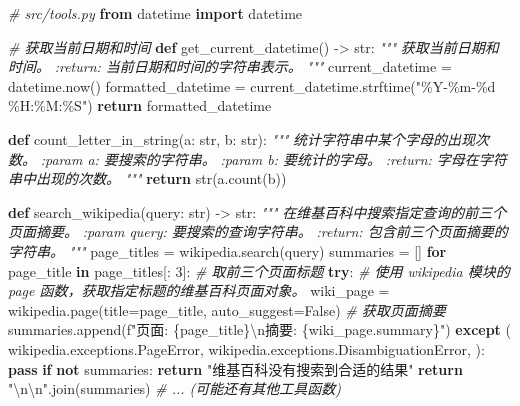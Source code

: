 \documentclass[
]{article}
\newenvironment{Shaded}{}{}
\newcommand{\BuiltInTok}[1]{\textcolor[rgb]{0.00,0.50,0.00}{#1}}
\newcommand{\CharTok}[1]{\textcolor[rgb]{0.25,0.44,0.63}{#1}}
\newcommand{\CommentTok}[1]{\textcolor[rgb]{0.38,0.63,0.69}{\textit{#1}}}
\newcommand{\ControlFlowTok}[1]{\textcolor[rgb]{0.00,0.44,0.13}{\textbf{#1}}}
\newcommand{\DecValTok}[1]{\textcolor[rgb]{0.25,0.63,0.44}{#1}}
\newcommand{\ImportTok}[1]{\textcolor[rgb]{0.00,0.50,0.00}{\textbf{#1}}}
\newcommand{\KeywordTok}[1]{\textcolor[rgb]{0.00,0.44,0.13}{\textbf{#1}}}
\newcommand{\NormalTok}[1]{#1}
\newcommand{\OperatorTok}[1]{\textcolor[rgb]{0.40,0.40,0.40}{#1}}
\newcommand{\SpecialCharTok}[1]{\textcolor[rgb]{0.25,0.44,0.63}{#1}}
\newcommand{\SpecialStringTok}[1]{\textcolor[rgb]{0.73,0.40,0.53}{#1}}
\newcommand{\StringTok}[1]{\textcolor[rgb]{0.25,0.44,0.63}{#1}}
\newcommand{\VariableTok}[1]{\textcolor[rgb]{0.10,0.09,0.49}{#1}}
\begin{document}
\begin{Shaded}
\begin{Highlighting}[]
\CommentTok{\# src/tools.py}
\ImportTok{from}\NormalTok{ datetime }\ImportTok{import}\NormalTok{ datetime}

\CommentTok{\# 获取当前日期和时间}
\KeywordTok{def}\NormalTok{ get\_current\_datetime() }\OperatorTok{{-}\textgreater{}} \BuiltInTok{str}\NormalTok{:}
    \CommentTok{"""}
\CommentTok{    获取当前日期和时间。}
\CommentTok{    :return: 当前日期和时间的字符串表示。}
\CommentTok{    """}
\NormalTok{    current\_datetime }\OperatorTok{=}\NormalTok{ datetime.now()}
\NormalTok{    formatted\_datetime }\OperatorTok{=}\NormalTok{ current\_datetime.strftime(}\StringTok{"\%Y{-}\%m{-}}\SpecialCharTok{\%d}\StringTok{ \%H:\%M:\%S"}\NormalTok{)}
    \ControlFlowTok{return}\NormalTok{ formatted\_datetime}

\KeywordTok{def}\NormalTok{ count\_letter\_in\_string(a: }\BuiltInTok{str}\NormalTok{, b: }\BuiltInTok{str}\NormalTok{):}
    \CommentTok{"""}
\CommentTok{    统计字符串中某个字母的出现次数。}
\CommentTok{    :param a: 要搜索的字符串。}
\CommentTok{    :param b: 要统计的字母。}
\CommentTok{    :return: 字母在字符串中出现的次数。}
\CommentTok{    """}
    \ControlFlowTok{return} \BuiltInTok{str}\NormalTok{(a.count(b))}

\KeywordTok{def}\NormalTok{ search\_wikipedia(query: }\BuiltInTok{str}\NormalTok{) }\OperatorTok{{-}\textgreater{}} \BuiltInTok{str}\NormalTok{:}
    \CommentTok{"""}
\CommentTok{    在维基百科中搜索指定查询的前三个页面摘要。}
\CommentTok{    :param query: 要搜索的查询字符串。}
\CommentTok{    :return: 包含前三个页面摘要的字符串。}
\CommentTok{    """}
\NormalTok{    page\_titles }\OperatorTok{=}\NormalTok{ wikipedia.search(query)}
\NormalTok{    summaries }\OperatorTok{=}\NormalTok{ []}
    \ControlFlowTok{for}\NormalTok{ page\_title }\KeywordTok{in}\NormalTok{ page\_titles[: }\DecValTok{3}\NormalTok{]:  }\CommentTok{\# 取前三个页面标题}
        \ControlFlowTok{try}\NormalTok{:}
            \CommentTok{\# 使用 wikipedia 模块的 page 函数，获取指定标题的维基百科页面对象。}
\NormalTok{            wiki\_page }\OperatorTok{=}\NormalTok{ wikipedia.page(title}\OperatorTok{=}\NormalTok{page\_title, auto\_suggest}\OperatorTok{=}\VariableTok{False}\NormalTok{)}
            \CommentTok{\# 获取页面摘要}
\NormalTok{            summaries.append(}\SpecialStringTok{f"页面: }\SpecialCharTok{\{}\NormalTok{page\_title}\SpecialCharTok{\}}\CharTok{\textbackslash{}n}\SpecialStringTok{摘要: }\SpecialCharTok{\{}\NormalTok{wiki\_page}\SpecialCharTok{.}\NormalTok{summary}\SpecialCharTok{\}}\SpecialStringTok{"}\NormalTok{)}
        \ControlFlowTok{except}\NormalTok{ (}
\NormalTok{                wikipedia.exceptions.PageError,}
\NormalTok{                wikipedia.exceptions.DisambiguationError,}
\NormalTok{        ):}
            \ControlFlowTok{pass}
    \ControlFlowTok{if} \KeywordTok{not}\NormalTok{ summaries:}
        \ControlFlowTok{return} \StringTok{"维基百科没有搜索到合适的结果"}
    \ControlFlowTok{return} \StringTok{"}\CharTok{\textbackslash{}n\textbackslash{}n}\StringTok{"}\NormalTok{.join(summaries)}
\CommentTok{\# ... (可能还有其他工具函数)}
\end{Highlighting}
\end{Shaded}
\end{document}
